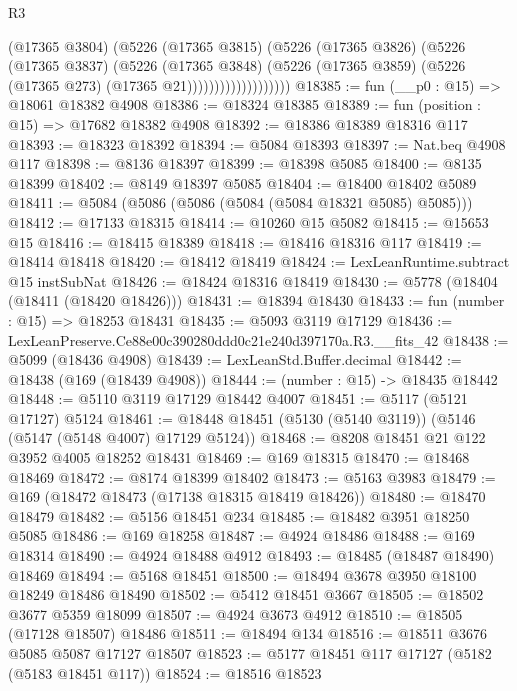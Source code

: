 \begin{lexlean}{R3}
\begin{coremodule}
                            (@17365 @3804)
                            (@5226
                              (@17365 @3815)
                              (@5226
                                (@17365 @3826)
                                (@5226
                                  (@17365 @3837)
                                  (@5226
                                    (@17365 @3848)
                                    (@5226
                                      (@17365 @3859)
                                      (@5226 (@17365 @273) (@17365 @21)))))))))))))))))))
@18385 := fun (__p0 : @15) => @18061 @18382 @4908
@18386 := @18324 @18385
@18389 := fun (position : @15) => @17682 @18382 @4908
@18392 := @18386 @18389 @18316 @117
@18393 := @18323 @18392
@18394 := @5084 @18393
@18397 := Nat.beq @4908 @117
@18398 := @8136 @18397
@18399 := @18398 @5085
@18400 := @8135 @18399
@18402 := @8149 @18397 @5085
@18404 := @18400 @18402 @5089
@18411 := @5084 (@5086 (@5086 (@5084 (@5084 @18321 @5085) @5085)))
@18412 := @17133 @18315
@18414 := @10260 @15 @5082
@18415 := @15653 @15
@18416 := @18415 @18389
@18418 := @18416 @18316 @117
@18419 := @18414 @18418
@18420 := @18412 @18419
@18424 := LexLeanRuntime.subtract @15 instSubNat
@18426 := @18424 @18316 @18419
@18430 := @5778 (@18404 (@18411 (@18420 @18426)))
@18431 := @18394 @18430
@18433 := fun (number : @15) => @18253 @18431
@18435 := @5093 @3119 @17129
@18436 := LexLeanPreserve.Ce88e00c390280ddd0c21e240d397170a.R3.__fits_42
@18438 := @5099 (@18436 @4908)
@18439 := LexLeanStd.Buffer.decimal
@18442 := @18438 (@169 (@18439 @4908))
@18444 := (number : @15) -> @18435 @18442
@18448 := @5110 @3119 @17129 @18442 @4007
@18451 := @5117 (@5121 @17127) @5124
@18461 := @18448 @18451 (@5130 (@5140 @3119)) (@5146 (@5147 (@5148 @4007) @17129 @5124))
@18468 := @8208 @18451 @21 @122 @3952 @4005 @18252 @18431
@18469 := @169 @18315
@18470 := @18468 @18469
@18472 := @8174 @18399 @18402
@18473 := @5163 @3983
@18479 := @169 (@18472 @18473 (@17138 @18315 @18419 @18426))
@18480 := @18470 @18479
@18482 := @5156 @18451 @234
@18485 := @18482 @3951 @18250 @5085
@18486 := @169 @18258
@18487 := @4924 @18486
@18488 := @169 @18314
@18490 := @4924 @18488 @4912
@18493 := @18485 (@18487 @18490) @18469
@18494 := @5168 @18451
@18500 := @18494 @3678 @3950 @18100 @18249 @18486 @18490
@18502 := @5412 @18451 @3667
@18505 := @18502 @3677 @5359 @18099
@18507 := @4924 @3673 @4912
@18510 := @18505 (@17128 @18507) @18486
@18511 := @18494 @134
@18516 := @18511 @3676 @5085 @5087 @17127 @18507
@18523 := @5177 @18451 @117 @17127 (@5182 (@5183 @18451 @117))
@18524 := @18516 @18523

\end{coremodule}
\end{lexlean}
